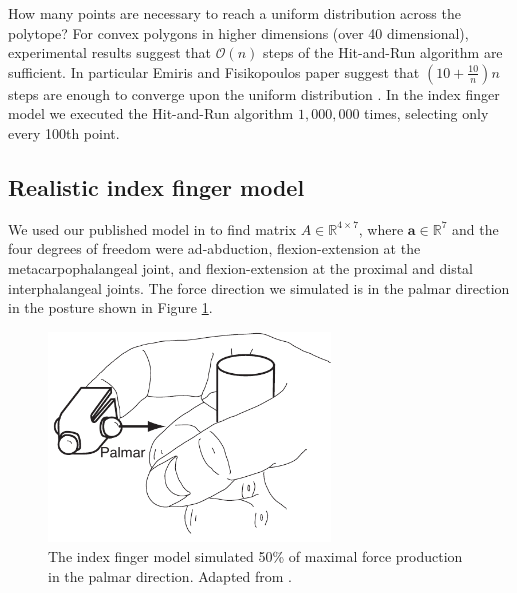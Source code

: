 How many points are necessary to reach a uniform distribution across the polytope?
For convex polygons in higher dimensions (over 40 dimensional), experimental results suggest that $\mathcal{O}(n)$ steps of the Hit-and-Run algorithm are sufficient. In particular Emiris and Fisikopoulos paper suggest that $(10 + \frac{10}{n})n$ steps are enough to converge upon the uniform distribution \cite{emiris2013efficient}.
In the index finger model we executed the Hit-and-Run algorithm $1,000,000$ times, selecting only every 100th point.

\subsection{Realistic index finger model}
\label{ss:finger}
We used our published model in \cite{Valero-Cuevas1998Large} to find matrix $A \in \mathbb{R}^{4 \times 7}$, where $\textbf{a} \in \mathbb{R}^7$ and the four degrees of freedom were ad-abduction, flexion-extension at the metacarpophalangeal joint, and flexion-extension at the proximal and distal interphalangeal joints. The force direction we simulated is in the palmar direction in the posture shown in Figure \ref{fig:finger}.
\begin{figure}[htbp]
\centering
\includegraphics[width=7.5cm]{sections/figs/finger.pdf}
\caption{The index finger model simulated 50\% of maximal force production in the palmar direction. Adapted from \cite{Valero-Cuevas1998Large}.}
\label{fig:finger}
\end{figure}


